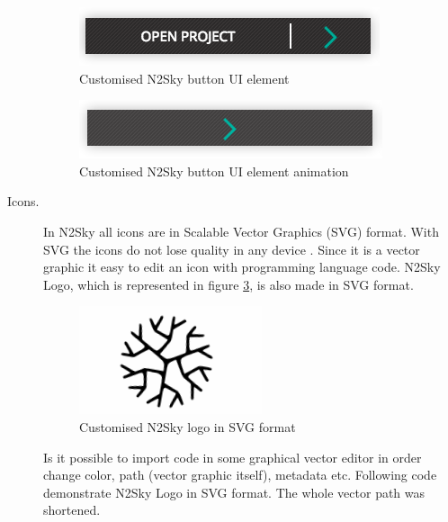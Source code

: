 \begin{description}
\begin{figure}[htbp]
\begin{center}
  \includegraphics[scale=0.55]{components/3/components/button_inactive.png}
  \caption{Customised N2Sky button UI element}
  \label{fig:button_inactive}
\end{center}
\end{figure}


\begin{figure}[htbp]
\begin{center}
  \includegraphics[scale=0.55]{components/3/components/button_active.png}
  \caption{Customised N2Sky button UI element animation}
  \label{fig:button_active}
\end{center}
\end{figure}

\item[Icons.] In N2Sky all icons are in Scalable Vector Graphics (SVG) format. With SVG the icons do not lose quality in any device \cite{Cagle2005}. Since it is a vector graphic it easy to edit an icon with programming language code. N2Sky Logo, which is represented in figure \ref{fig:logo},  is also made in SVG format. 

\begin{figure}[htbp]
\begin{center}
  \includegraphics[scale=0.55]{components/3/components/logo.png}
  \caption{Customised N2Sky logo in SVG format}
  \label{fig:logo}
\end{center}
\end{figure}

Is it possible to import code in some graphical vector editor in order change color, path (vector graphic itself), metadata etc. Following code demonstrate N2Sky Logo in SVG format. The whole vector path was shortened.


\end{description}
